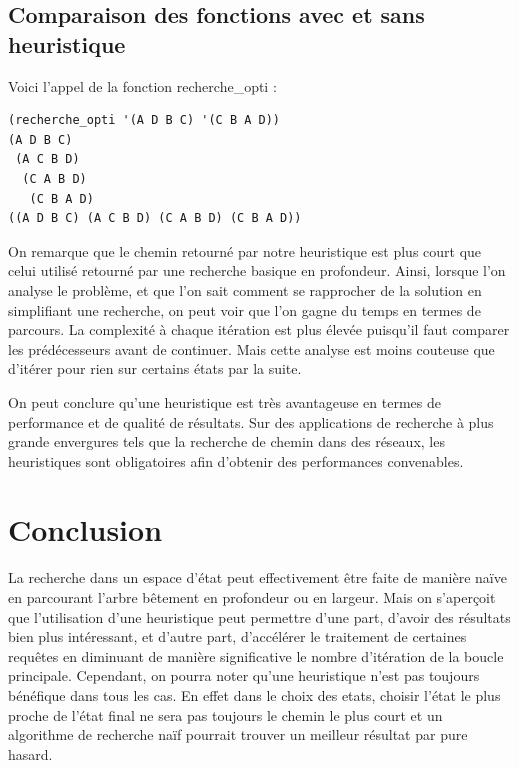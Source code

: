 \documentclass[a4paper,10pt]{report}
\begin{document}
  \section{Comparaison des fonctions avec et sans heuristique }
  
  Voici l’appel de la fonction recherche\_opti :
\begin{lstlisting}[language=Lisp]
(recherche_opti '(A D B C) '(C B A D))
(A D B C)
 (A C B D)
  (C A B D)
   (C B A D)
((A D B C) (A C B D) (C A B D) (C B A D))
\end{lstlisting}

On remarque que le chemin retourné par notre heuristique est plus court que celui utilisé retourné par une recherche basique en profondeur.
Ainsi, lorsque l’on analyse le problème, et que l’on sait comment se rapprocher de la solution en simplifiant une recherche, on peut voir que l’on gagne du temps en termes de parcours. La complexité à chaque itération est plus élevée puisqu’il faut comparer les prédécesseurs avant de continuer. Mais cette analyse est moins couteuse que d’itérer pour rien sur certains états par la suite.

On peut conclure qu’une heuristique est très avantageuse en termes de performance et de qualité de résultats. Sur des applications de recherche à plus grande envergures tels que la recherche de chemin dans des réseaux, les heuristiques sont obligatoires afin d’obtenir des performances convenables.

\chapter*{Conclusion}

  La recherche dans un espace d'état peut effectivement être faite de manière naïve en parcourant l'arbre bêtement en profondeur ou en largeur. Mais on s'aperçoit
  que l'utilisation d'une heuristique peut permettre d'une part, d'avoir des résultats bien plus intéressant, et d'autre part, d'accélérer le traitement de certaines 
  requêtes en diminuant de manière significative le nombre d'itération de la boucle principale. \newline 
  Cependant, on pourra noter qu'une heuristique n'est pas toujours bénéfique dans tous les cas. En effet dans le choix des etats, choisir l'état le plus proche de 
  l'état final ne sera pas toujours le chemin le plus court et un algorithme de recherche naïf pourrait trouver un meilleur résultat par pure hasard.
  
  
\end{document}
